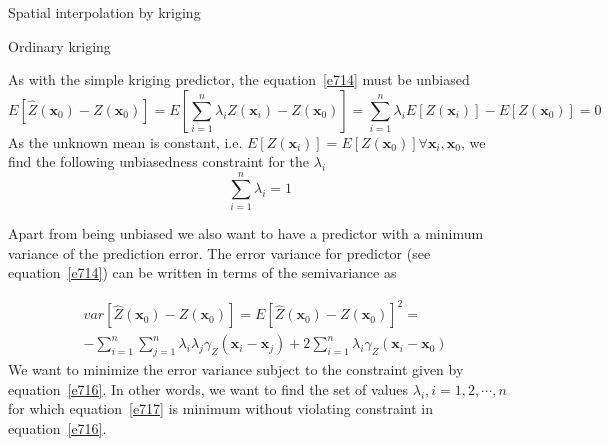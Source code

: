 \documentclass[8pt]{beamer}
\renewcommand{\emph}[1]{\textcolor{myorange}{#1}}
\begin{document}
 \begin{frame}{Spatial interpolation by kriging}
     \begin{block}{Ordinary kriging}
    \end{block}
    As with the \emph{simple kriging} predictor, the equation~\ref{e714} must be unbiased
    \begin{equation}
    E[\hat{Z}(\mathbf{x}_0) - Z(\mathbf{x}_0)] =  E\left[ \sum_{i=1}^n \lambda_i Z(\mathbf{x}_i) -Z(\mathbf{x}_0) \right] =  \sum_{i=1}^n \lambda_i E[Z(\mathbf{x}_i)] - E[Z(\mathbf{x}_0)] = 0
        \label{e715}
    \end{equation}
As the unknown \emph{mean} is constant, i.e. $E[Z(\mathbf{x}_i)] = E[Z(\mathbf{x}_0)] \forall \mathbf{x}_i , \mathbf{x}_0$, we find the following \emph{unbiasedness constraint} for the $\lambda_i$
    \begin{equation}
        \sum_{i=1}^n \lambda_i = 1
        \label{e716}
    \end{equation}

    Apart from being unbiased we also want to have a predictor with a \emph{minimum variance} of the \emph{prediction error}. The \emph{error variance} for predictor (see equation~\ref{e714}) can be written in terms of the \emph{semivariance} as 

    \begin{equation}
        \begin{aligned}
            &var[\hat{Z}(\mathbf{x}_0) - Z(\mathbf{x}_0)] = E[\hat{Z}(\mathbf{x}_0) - Z(\mathbf{x}_0)]^2 = \\ 
            &-\sum_{i=1}^n \sum_{j=1}^n \lambda_i \lambda_j \gamma_Z (\mathbf{x}_i - \mathbf{x}_j) + 2\sum_{i=1}^n \lambda_i \gamma_Z (\mathbf{x}_i - \mathbf{x}_0)
        \end{aligned}
        \label{e717}
    \end{equation}
    We want to minimize the \emph{error variance} subject to the constraint given by equation~\ref{e716}. In other words, we want to find the set of values $\lambda_i, i=1,2,\cdots,n$  for which equation~\ref{e717} is minimum without violating constraint in equation~\ref{e716}. 
   \end{frame}
\end{document}
